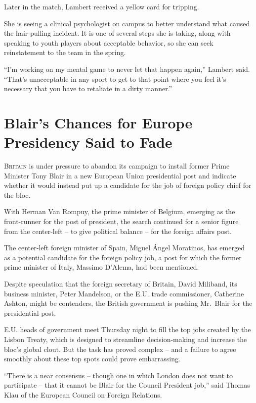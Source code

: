 ﻿\documentclass[12pt]{article}
\begin{document}
Later in the match, Lambert received a yellow card for tripping.

She is seeing a clinical psychologist on campus to better understand what caused the hair-pulling
incident. It is one of several steps she is taking, along with speaking to youth players about
acceptable behavior, so she can seek reinstatement to the team in the spring.

``I'm working on my mental game to never let that happen again,'' Lambert said. ``That's
unacceptable in any sport to get to that point where you feel it's necessary that you have to
retaliate in a dirty manner.''

\section{Blair's Chances for Europe Presidency Said to Fade}

\lettrine{B}{ritain} is under pressure to abandon its campaign to install
former Prime Minister Tony Blair in a new European Union presidential post and indicate whether it
would instead put up a candidate for the job of foreign policy chief for the bloc.

With Herman Van Rompuy, the prime minister of Belgium, emerging as the front-runner for the post of
president, the search continued for a senior figure from the center-left -- to give political
balance -- for the foreign affairs post.

The center-left foreign minister of Spain, Miguel \'Angel Moratinos, has emerged as a potential
candidate for the foreign policy job, a post for which the former prime minister of Italy, Massimo
D'Alema, had been mentioned.

Despite speculation that the foreign secretary of Britain, David Miliband, its business minister,
Peter Mandelson, or the E.U. trade commissioner, Catherine Ashton, might be contenders, the British
government is pushing Mr.~Blair for the presidential post.

E.U. heads of government meet Thursday night to fill the top jobs created by the Lisbon Treaty,
which is designed to streamline decision-making and increase the bloc's global clout. But the task
has proved complex -- and a failure to agree smoothly about these top spots could prove
embarrassing.

``There is a near consensus -- though one in which London does not want to participate -- that it
cannot be Blair for the Council President job,'' said Thomas Klau of the European Council on Foreign
Relations.
\end{document}
